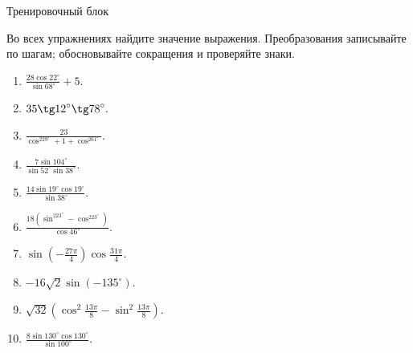 \documentclass[a4paper,11pt]{article}
\begin{document}
\begin{center}{\LARGE\color{darkaccent} Тренировочный блок}\par{}\end{center}
\vspace{7mm}
Во всех упражнениях найдите значение выражения. Преобразования записывайте по шагам; обосновывайте сокращения и проверяйте знаки.
\begin{enumerate}[leftmargin=9mm,itemsep=10pt,topsep=10pt]
\item $\displaystyle \frac{28\cos22^\circ}{\sin68^\circ}+5.$
\item $\displaystyle 35\tg12^\circ\tg78^\circ.$
\item $\displaystyle \frac{23}{\cos^229^\circ+1+\cos^261^\circ}.$
\item $\displaystyle \frac{7\sin104^\circ}{\sin52^\circ\sin38^\circ}.$
\item $\displaystyle \frac{14\sin19^\circ\cos19^\circ}{\sin38^\circ}.$
\item $\displaystyle \frac{18(\sin^223^\circ-\cos^223^\circ)}{\cos46^\circ}.$
\item $\displaystyle \sin\left(-\frac{27\pi}{4}\right)\cos\frac{31\pi}{4}.$
\item $\displaystyle -16\sqrt2\sin(-135^\circ).$
\item $\displaystyle \sqrt{32}\left(\cos^2\frac{13\pi}{8}-\sin^2\frac{13\pi}{8}\right).$
\item $\displaystyle \frac{8\sin130^\circ\cos130^\circ}{\sin100^\circ}.$
\end{enumerate}
\clearpage
\end{document}
